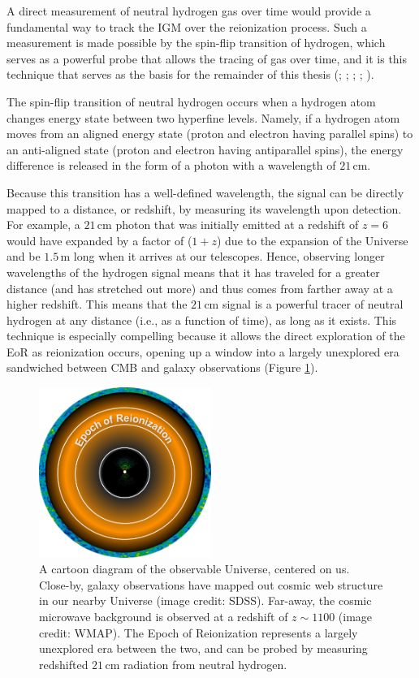 A direct measurement of neutral hydrogen gas over time would provide a fundamental way to track the IGM over the reionization process. Such a measurement is made possible by the spin-flip transition of hydrogen, which serves as a powerful probe that allows the tracing of gas over time, and it is this technique that serves as the basis for the remainder of this thesis (\citealt{furlanetto_et_al2006}; \citealt{barkana_and_loeb2008}; \citealt{morales_and_wyithe2010}; \citealt{pritchard_and_loeb2010}; \citealt{pritchard_loeb2012}). 

The spin-flip transition of neutral hydrogen occurs when a hydrogen atom changes energy state between two hyperfine levels. Namely, if a hydrogen atom moves from an aligned energy state (proton and electron having parallel spins) to an anti-aligned state (proton and electron having antiparallel spins), the energy difference is released in the form of a photon with a wavelength of $21$\,cm. 

Because this transition has a well-defined wavelength, the signal can be directly mapped to a distance, or redshift, by measuring its wavelength upon detection. For example, a $21$\,cm photon that was initially emitted at a redshift of $z = 6$ would have expanded by a factor of ($1+z$) due to the expansion of the Universe and be $1.5$\,m long when it arrives at our telescopes. Hence, observing longer wavelengths of the hydrogen signal means that it has traveled for a greater distance (and has stretched out more) and thus comes from farther away at a higher redshift. This means that the $21$\,cm signal is a powerful tracer of neutral hydrogen at any distance (i.e., as a function of time), as long as it exists. This technique is especially compelling because it allows the direct exploration of the EoR as reionization occurs, opening up a window into a largely unexplored era sandwiched between CMB and galaxy observations (Figure \ref{fig:timeline_circle}).

\begin{figure}
	\centering
	\includegraphics[width=0.5\textwidth]{plots/timeline_circle.pdf}
	\caption{A cartoon diagram of the observable Universe, centered on us. Close-by, galaxy observations have mapped out cosmic web structure in our nearby Universe (image credit: SDSS). Far-away, the cosmic microwave background is observed at a redshift of $z \sim 1100$ (image credit: WMAP). The Epoch of Reionization represents a largely unexplored era between the two, and can be probed by measuring redshifted $21$\,cm radiation from neutral hydrogen.}
	\label{fig:timeline_circle}
\end{figure}

